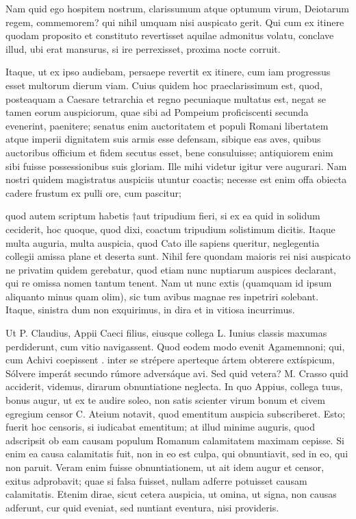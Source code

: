  Nam quid ego hospitem nostrum, clarissumum atque optumum virum, Deiotarum regem, commemorem? qui nihil umquam nisi auspicato gerit. Qui cum ex itinere quodam proposito et constituto revertisset aquilae admonitus volatu, conclave illud, ubi erat mansurus, si ire perrexisset, proxima nocte corruit.

 Itaque, ut ex ipso audiebam, persaepe revertit ex itinere, cum iam progressus esset multorum dierum viam. Cuius quidem hoc praeclarissimum est, quod, posteaquam a Caesare tetrarchia et regno pecuniaque multatus est, negat se tamen eorum auspiciorum, quae sibi ad Pompeium proficiscenti secunda evenerint, paenitere; senatus enim auctoritatem et populi Romani libertatem atque imperii dignitatem suis armis esse defensam, sibique eas aves, quibus auctoribus officium et fidem secutus esset, bene consuluisse; antiquiorem enim sibi fuisse possessionibus suis gloriam. Ille mihi videtur igitur vere augurari. Nam nostri quidem magistratus auspiciis utuntur coactis; necesse est enim offa obiecta cadere frustum ex pulli ore, cum pascitur;

 quod autem scriptum habetis †aut tripudium fieri, si ex ea quid in solidum ceciderit, hoc quoque, quod dixi, coactum tripudium solistimum dicitis. Itaque multa auguria, multa auspicia, quod Cato ille sapiens queritur, neglegentia collegii amissa plane et deserta sunt. Nihil fere quondam maioris rei nisi auspicato ne privatim quidem gerebatur, quod etiam nunc nuptiarum auspices declarant, qui re omissa nomen tantum tenent. Nam ut nunc extis (quamquam id ipsum aliquanto minus quam olim), sic tum avibus magnae res inpetriri solebant. Itaque, sinistra dum non exquirimus, in dira et in vitiosa incurrimus.

 Ut P. Claudius, Appii Caeci filius, eiusque collega L. Iunius classis maxumas perdiderunt, cum vitio navigassent. Quod eodem modo evenit Agamemnoni; qui, cum Achivi coepissent . inter se strépere aperteque ártem obterere extíspicum, Sólvere imperát secundo rúmore adversáque avi. Sed quid vetera? M. Crasso quid acciderit, videmus, dirarum obnuntiatione neglecta. In quo Appius, collega tuus, bonus augur, ut ex te audire soleo, non satis scienter virum bonum et civem egregium censor C. Ateium notavit, quod ementitum auspicia subscriberet. Esto; fuerit hoc censoris, si iudicabat ementitum; at illud minime auguris, quod adscripsit ob eam causam populum Romanum calamitatem maximam cepisse. Si enim ea causa calamitatis fuit, non in eo est culpa, qui obnuntiavit, sed in eo, qui non paruit. Veram enim fuisse obnuntiationem, ut ait idem augur et censor, exitus adprobavit; quae si falsa fuisset, nullam adferre potuisset causam calamitatis. Etenim dirae, sicut cetera auspicia, ut omina, ut signa, non causas adferunt, cur quid eveniat, sed nuntiant eventura, nisi provideris.


